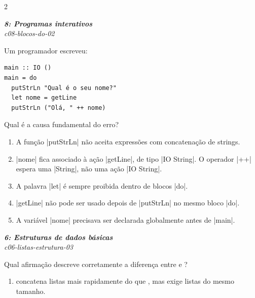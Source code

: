 \documentclass[a4paper,10pt,brazil]{article}
\begin{document}
\begin{multicols}{2}
\begin{flushright}
  \footnotesize
  \textit{\textbf{8: Programas interativos}}\\
  \textit{c08-blocos-do-02}\\

\end{flushright}
Um programador escreveu:

\begin{verbatim}
main :: IO ()
main = do
  putStrLn "Qual é o seu nome?"
  let nome = getLine
  putStrLn ("Olá, " ++ nome)
\end{verbatim}

Qual é a causa fundamental do erro?

\begin{enumerate}
  \item A função \haskellinline|putStrLn| não aceita expressões com concatenação de strings.

  \item \haskellinline|nome| fica associado à ação \haskellinline|getLine|, de tipo \haskellinline|IO String|. O operador \haskellinline|++| espera uma \haskellinline|String|, não uma ação \haskellinline|IO String|.

  \item A palavra \haskellinline|let| é sempre proibida dentro de blocos \haskellinline|do|.

  \item \haskellinline|getLine| não pode ser usado depois de \haskellinline|putStrLn| no mesmo bloco \haskellinline|do|.

  \item A variável \haskellinline|nome| precisava ser declarada globalmente antes de \haskellinline|main|.


\end{enumerate}

\begin{flushright}
  \footnotesize
  \textit{\textbf{6: Estruturas de dados básicas}}\\
  \textit{c06-listas-estrutura-03}\\

\end{flushright}
Qual afirmação descreve corretamente a diferença entre \haskellinline{(:)} e \haskellinline{(++)}?

\begin{enumerate}
  \item \haskellinline{(:)} concatena listas mais rapidamente do que \haskellinline{(++)}, mas exige listas do mesmo tamanho.


\end{enumerate}
\end{multicols}
\end{document}
